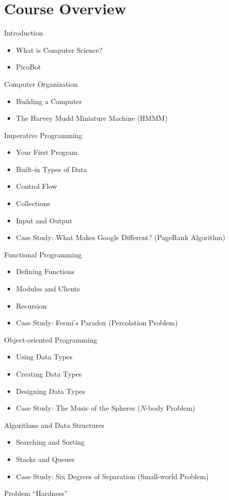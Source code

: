\documentclass[8pt,a4paper,compress]{beamer}
\begin{document}
\section{Course Overview}

\begin{frame}[fragile]
Introduction
\begin{itemize}
\item What is Computer Science?
\item PicoBot
\end{itemize}

\smallskip

Computer Organization
\begin{itemize}
\item Building a Computer
\item The Harvey Mudd Miniature Machine (HMMM)
\end{itemize}

\smallskip

Imperative Programming
\begin{itemize}
\item Your First Program
\item Built-in Types of Data
\item Control Flow
\item Collections
\item Input and Output
\item Case Study: What Makes Google Different? (PageRank Algorithm)
\end{itemize}
\end{frame}

\begin{frame}[fragile]
Functional Programming
\begin{itemize}
\item Defining Functions
\item Modules and Clients
\item Recursion
\item Case Study: Fermi's Paradox (Percolation Problem)
\end{itemize}

\bigskip

Object-oriented Programming
\begin{itemize}
\item Using Data Types
\item Creating Data Types
\item Designing Data Types
\item Case Study: The Music of the Spheres ($N$-body Problem)
\end{itemize}

\bigskip

Algorithms and Data Structures
\begin{itemize}
\item Searching and Sorting
\item Stacks and Queues
\item Case Study: Six Degrees of Separation (Small-world Problem)
\end{itemize}

\bigskip

Problem ``Hardness''
\end{frame}
\end{document}
